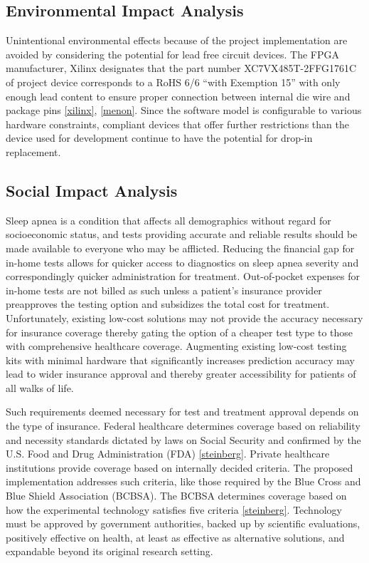 \documentclass[12pt,titlepage]{article}
\begin{document}
\subsection{Environmental Impact Analysis}
Unintentional environmental effects because of the project implementation are avoided by considering the potential for lead free circuit
devices. The FPGA manufacturer, Xilinx designates that the part number XC7VX485T-2FFG1761C of project device corresponds to a RoHS 6/6
“with Exemption 15” with only enough lead content to ensure proper connection between internal die wire and package pins \ref{xilinx},
\ref{menon}.  Since the software model is configurable to various hardware constraints, compliant devices that offer further restrictions
than the device used for development continue to have the potential for drop-in replacement. 

\subsection{Social Impact Analysis}
Sleep apnea is a condition that affects all demographics without regard for socioeconomic status, and tests providing accurate and reliable
results should be made available to everyone who may be afflicted. Reducing the financial gap for in-home tests allows for quicker access
to diagnostics on sleep apnea severity and correspondingly quicker administration for treatment. Out-of-pocket expenses for in-home tests
are not billed as such unless a patient’s insurance provider preapproves the testing option and subsidizes the total cost for treatment.
Unfortunately, existing low-cost solutions may not provide the accuracy necessary for insurance coverage thereby gating the option of a
cheaper test type to those with comprehensive healthcare coverage. Augmenting existing low-cost testing kits with minimal hardware that
significantly increases prediction accuracy may lead to wider insurance approval and thereby greater accessibility for patients of all
walks of life. 

Such requirements deemed necessary for test and treatment approval depends on the type of insurance. Federal healthcare determines coverage
based on reliability and necessity standards dictated by laws on Social Security and confirmed by the U.S. Food and Drug Administration (FDA)
\ref{steinberg}. Private healthcare institutions provide coverage based on internally decided criteria. The proposed implementation addresses
such criteria, like those required by the Blue Cross and Blue Shield Association (BCBSA). The BCBSA determines coverage based on how the
experimental technology satisfies five criteria \ref{steinberg}. Technology must be approved by government authorities, backed up by scientific
evaluations, positively effective on health, at least as effective as alternative solutions, and expandable beyond its original research setting.
\end{document}
